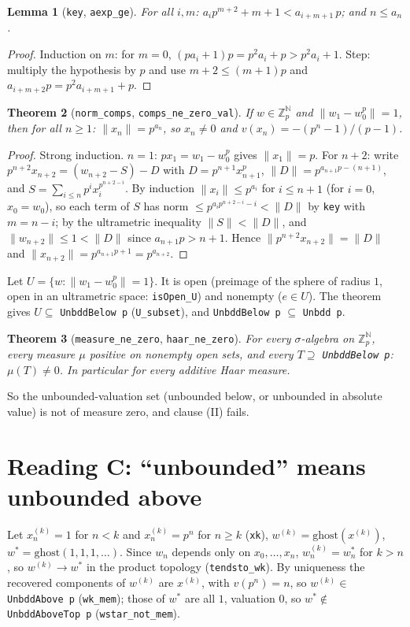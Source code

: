 \documentclass[11pt]{article}
\newtheorem{theorem}{Theorem}
\newtheorem{lemma}[theorem]{Lemma}
\theoremstyle{definition}
\newcommand{\Zp}{\mathbb{Z}_p}
\newcommand{\lean}[1]{\texttt{#1}}
\begin{document}
\begin{lemma}[\lean{key}, \lean{aexp\_ge}]
For all $i,m$: $a_i p^{m+2}+m+1<a_{i+m+1}\,p$; and $n\le a_n$.
\end{lemma}
\begin{proof}
Induction on $m$: for $m=0$, $(pa_i+1)p=p^2a_i+p>p^2a_i+1$. Step: multiply the hypothesis by $p$ and use
$m+2\le(m+1)p$ and $a_{i+m+2}p=p^2a_{i+m+1}+p$.
\end{proof}

\begin{theorem}[\lean{norm\_comps}, \lean{comps\_ne\_zero\_val}]
If $w\in\Zp^{\mathbb N}$ and $\|w_1-w_0^p\|=1$, then for all $n\ge1$: $\|x_n\|=p^{a_n}$, so $x_n\ne0$ and
$v(x_n)=-(p^n-1)/(p-1)$.
\end{theorem}
\begin{proof}
Strong induction. $n=1$: $p x_1=w_1-w_0^p$ gives $\|x_1\|=p$. For $n+2$: write
$p^{n+2}x_{n+2}=(w_{n+2}-S)-D$ with $D=p^{n+1}x_{n+1}^p$, $\|D\|=p^{a_{n+1}p-(n+1)}$, and
$S=\sum_{i\le n}p^i x_i^{p^{n+2-i}}$. By induction $\|x_i\|\le p^{a_i}$ for $i\le n+1$ (for $i=0$, $x_0=w_0$), so
each term of $S$ has norm $\le p^{a_ip^{n+2-i}-i}<\|D\|$ by \lean{key} with $m=n-i$; by the ultrametric
inequality $\|S\|<\|D\|$, and $\|w_{n+2}\|\le1<\|D\|$ since $a_{n+1}p>n+1$. Hence
$\|p^{n+2}x_{n+2}\|=\|D\|$ and $\|x_{n+2}\|=p^{a_{n+1}p+1}=p^{a_{n+2}}$.
\end{proof}

Let $U=\{w:\|w_1-w_0^p\|=1\}$. It is open (preimage of the sphere of radius $1$, open in an ultrametric
space: \lean{isOpen\_U}) and nonempty ($e\in U$). The theorem gives $U\subseteq$ \lean{UnbddBelow p}
(\lean{U\_subset}), and \lean{UnbddBelow p} $\subseteq$ \lean{Unbdd p}.

\begin{theorem}[\lean{measure\_ne\_zero}, \lean{haar\_ne\_zero}]
For every $\sigma$-algebra on $\Zp^{\mathbb N}$, every measure $\mu$ positive on nonempty open sets, and every
$T\supseteq$ \lean{UnbddBelow p}: $\mu(T)\neq0$. In particular for every additive Haar measure.
\end{theorem}
So the unbounded-valuation set (unbounded below, or unbounded in absolute value) is not of measure zero,
and clause (II) fails.

\section{Reading C: ``unbounded'' means unbounded above}

Let $x^{(k)}_n=1$ for $n<k$ and $x^{(k)}_n=p^n$ for $n\ge k$ (\lean{xk}), $w^{(k)}=\mathrm{ghost}(x^{(k)})$,
$w^*=\mathrm{ghost}(1,1,1,\dots)$. Since $w_n$ depends only on $x_0,\dots,x_n$, $w^{(k)}_n=w^*_n$ for $k>n$,
so $w^{(k)}\to w^*$ in the product topology (\lean{tendsto\_wk}). By uniqueness the recovered components of
$w^{(k)}$ are $x^{(k)}$, with $v(p^n)=n$, so $w^{(k)}\in$ \lean{UnbddAbove p} (\lean{wk\_mem}); those of $w^*$
are all $1$, valuation $0$, so $w^*\notin$ \lean{UnbddAboveTop p} (\lean{wstar\_not\_mem}).
\end{document}
